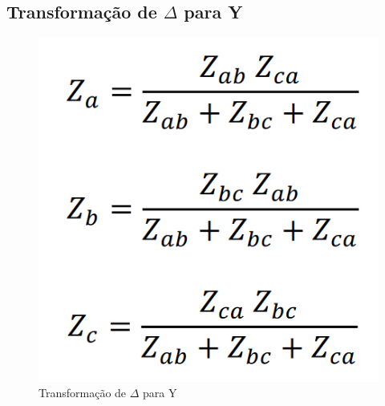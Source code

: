 \documentclass[a4paper, 12pt]{article}
\begin{document}
	\subsection{Transformação de $\Delta$ para Y}
		\begin{figure}[h]
			\centering
			\includegraphics[scale=0.4]{a6.png}
			\caption{Transformação de $\Delta$ para Y}
		\end{figure}
\end{document}
